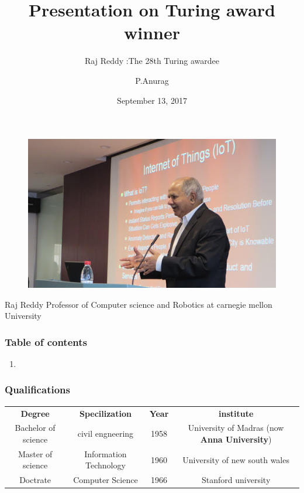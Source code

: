 \documentclass{beamer}
\title{Presentation on Turing award winner}
\subtitle{Raj Reddy :The 28th Turing awardee}
\author{P.Anurag}
\institute{SCIS University of Hyderabad}
\date{September 13, 2017}
\begin{document}
 
 \maketitle
 
\begin{frame}

\begin{figure}
 \centering
 \includegraphics[scale=0.5]{raj1.jpg}
\end{figure} 


\begin{block}{}
 Raj Reddy Professor of Computer science and Robotics at carnegie mellon University
\end{block}

\end{frame}

 
\begin{frame}
  \frametitle{Table of contents}
  \begin{enumerate}
   \item 
  \end{enumerate}

\end{frame}

\begin{frame}
 \frametitle{\bf Qualifications}
  \begin{block}
    \begin{tabular}{cccc}
     {\bf Degree} & {\bf Specilization} & {\bf Year} & {\bf institute} \\
     Bachelor of science & civil engneering & 1958 & University of Madras (now {\bf Anna University}) \\
     Master of science & Information Technology & 1960 & University of new south wales \\
     Doctrate & Computer Science & 1966 & Stanford university \\
    \end{tabular}

  \end{block}
\end{frame}
\end{document}
